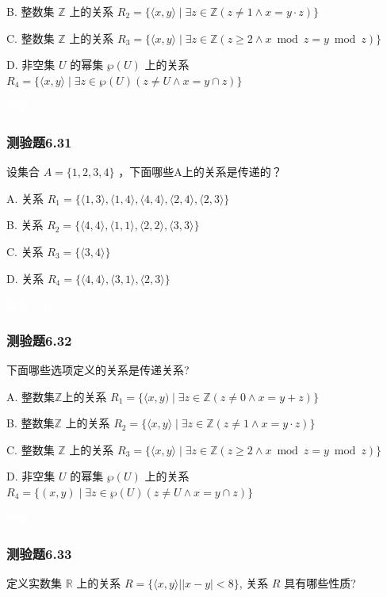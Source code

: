 \documentclass[UTF8, heading=true]{ctexart}
\begin{document}
B. 整数集 $\mathbb{Z}$ 上的关系 $R_2=\{\langle x, y\rangle \mid \exists z \in \mathbb{Z}(z \neq 1 \wedge x=y \cdot z)\}$

C. 整数集 $\mathbb{Z}$ 上的关系 $R_3=\{\langle x, y\rangle \mid \exists z \in \mathbb{Z}(z \geq 2 \wedge x \bmod z=y \bmod z)\}$

D. 非空集 $U$ 的幂集 $\wp(U)$ 上的关系 $R_4=\{\langle x, y\rangle \mid \exists z \in \wp(U)(z \neq U \wedge x=y \cap z)\}$

\textcolor{white}{答案：D}

\subsubsection{测验题6.31}

设集合 $A=\{1,2,3,4\}$ ，下面哪些A上的关系是传递的？

A. 关系 $R_1=\{\langle 1,3\rangle,\langle 1,4\rangle,\langle 4,4\rangle,\langle 2,4\rangle,\langle 2,3\rangle\}$

B. 关系 $R_2=\{\langle 4,4\rangle,\langle 1,1\rangle,\langle 2,2\rangle,\langle 3,3\rangle\}$

C. 关系 $R_3=\{\langle 3,4\rangle\}$

D.  关系 $R_4=\{\langle 4,4\rangle,\langle 3,1\rangle,\langle 2,3\rangle\}$


\textcolor{white}{答案：ABC}

\subsubsection{测验题6.32}

下面哪些选项定义的关系是传递关系?

A. 整数集$\mathbb{Z}$上的关系 $R_1=\{\langle x, y) \mid \exists z \in \mathbb{Z}(z \neq 0 \wedge x=y+z)\}$

B. 整数集$\mathbb{Z}$ 上的关系 $R_2=\{\langle x, y\rangle \mid \exists z \in \mathbb{Z}(z \neq 1 \wedge x=y \cdot z)\}$

C. 整数集 $\mathbb{Z}$ 上的关系 $R_3=\{\langle x, y\rangle \mid \exists z \in \mathbb{Z}(z \geq 2 \wedge x \bmod z=y \bmod z)\}$

D. 非空集 $U$ 的幂集 $\wp(U)$ 上的关系 $R_4=\{(x, y) \mid \exists z \in \wp(U)(z \neq U \wedge x=y \cap z)\}$

\textcolor{white}{答案：D}


\subsubsection{测验题6.33}
定义实数集 $\mathbb{R}$ 上的关系 $R=\{\langle x, y\rangle| | x-y \mid<8\}$, 关系 $R$ 具有哪些性质?
\end{document}
